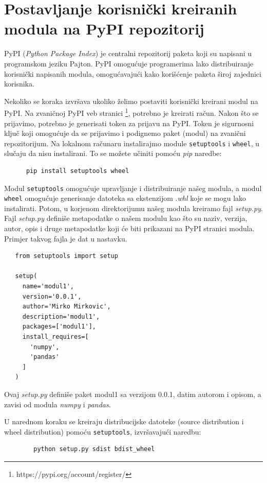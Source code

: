 \section{Postavljanje korisnički kreiranih modula  na PyPI repozitorij}

PyPI (\textit{Python Package Index}) je centralni repozitorij paketa   koji su napisani u programskom jeziku Pajton. PyPI omogućuje programerima lako distribui\-ranje korisnički napisanih modula,  omogućavajući kako korišćenje paketa široj zajednici korisnika.
 
Nekoliko   se koraka izvršava ukoliko želimo postaviti   korisnički krei\-rani modul na PyPI. Na zvaničnoj PyPI veb stranici \footnote{https://pypi.org/account/register/},  potrebno je kreirati račun. Nakon što se prijavimo, potrebno je  generisati token za prijavu na PyPI. Token je sigurnosni ključ koji omogućuje da se prijavimo i  podi\-gnemo  paket (modul) na zvanični repozitorijum.  Na lokalnom računaru instalirajmo module  \texttt{setuptools} i \texttt{wheel}, u slučaju da nisu instalirani. To se možete učiniti pomoću \textit{pip} naredbe:
 \begin{verbatim}
      pip install setuptools wheel
 \end{verbatim}

Modul \texttt{setuptools} omogućuje upravljanje i distribuiranje našeg modula, a modul \texttt{wheel}   omogućuje generisanje datoteka sa ekstenzijom .\textit{whl} koje se mogu lako instalirati. Potom,  u korjenom direktorijumu našeg modula  kreiramo fajl \textit{setup.py}. Fajl \textit{setup.py}  definiše metapoda\-tke o našem modulu kao što su naziv, verzija, autor, opis i druge metapodatke koji će biti prikazani na PyPI stranici   modula. Primjer takvog fajla je dat u nastavku.

\begin{verbatim}
   from setuptools import setup
   
   setup(
     name='modul1',
     version='0.0.1',
     author='Mirko Mirkovic',
     description='modul1',
     packages=['modul1'],
     install_requires=[
       'numpy',
       'pandas'
     ]
   )
\end{verbatim}
Ovaj \textit{ setup.py}   definiše paket modul1 sa verzijom 0.0.1, datim autorom  i opisom, a zavisi od modula \textit{numpy} i \textit{pandas}.

U narednom koraku se kreiraju distribucijske datoteke (source distr\-ibution i wheel distribution) pomoću \texttt{setuptools}, izvršavajući naredbu:
\begin{verbatim}
        python setup.py sdist bdist_wheel
\end{verbatim}
 
